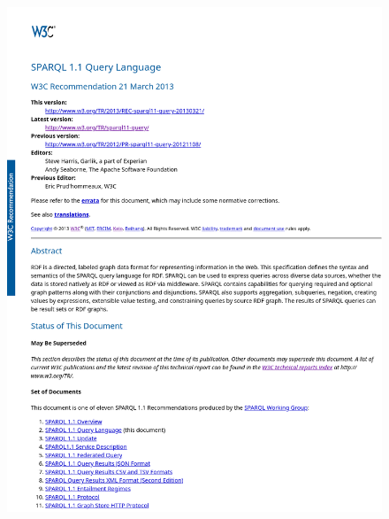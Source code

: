 \documentclass[
	aspectratio=169,
	compress,
]{beamer}
\begin{document}
\begin{frame}
\begin{columns}[T]
\begin{column}{0.3\textwidth}
\begin{figure}
\begin{center}
                    \includegraphics[width=\textwidth]{./figures/sparqlDocs.png}
                \end{center}
            \end{figure}
        \end{column}
    \end{columns}
\end{frame}
\end{document}
